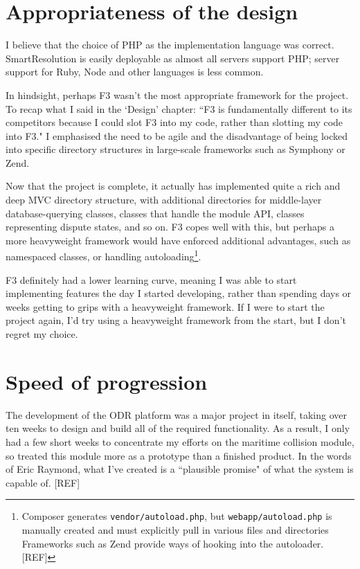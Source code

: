 \section{Appropriateness of the design}


I believe that the choice of PHP as the implementation language was correct. SmartResolution is easily deployable as almost all servers support PHP; server support for Ruby, Node and other languages is less common.

In hindsight, perhaps F3 wasn't the most appropriate framework for the project. To recap what I said in the `Design' chapter: ``F3 is fundamentally different to its competitors because I could slot F3 into my code, rather than slotting my code into F3." I emphasised the need to be agile and the disadvantage of being locked into specific directory structures in large-scale frameworks such as Symphony or Zend.

Now that the project is complete, it actually has implemented quite a rich and deep MVC directory structure, with additional directories for middle-layer database-querying classes, classes that handle the module API, classes representing dispute states, and so on. F3 copes well with this, but perhaps a more heavyweight framework would have enforced additional advantages, such as namespaced classes, or handling autoloading\footnote{Composer generates \lstinline{vendor/autoload.php}, but \lstinline{webapp/autoload.php} is manually created and must explicitly pull in various files and directories Frameworks such as Zend provide ways of hooking into the autoloader. [REF]}. %

F3 definitely had a lower learning curve, meaning I was able to start implementing features the day I started developing, rather than spending days or weeks getting to grips with a heavyweight framework. If I were to start the project again, I'd try using a heavyweight framework from the start, but I don't regret my choice.

\section{Speed of progression}

The development of the ODR platform was a major project in itself, taking over ten weeks to design and build all of the required functionality. As a result, I only had a few short weeks to concentrate my efforts on the maritime collision module, so treated this module more as a prototype than a finished product. In the words of Eric Raymond, what I've created is a ``plausible promise" of what the system is capable of. [REF] %

